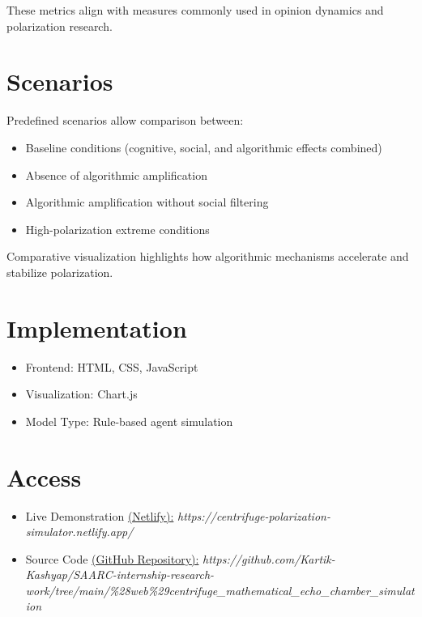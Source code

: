 \documentclass[12pt,a4paper]{report}
\begin{document}
These metrics align with measures commonly used in opinion dynamics and polarization research.

\section{Scenarios}

Predefined scenarios allow comparison between:
\begin{itemize}
    \item Baseline conditions (cognitive, social, and algorithmic effects combined)
    \item Absence of algorithmic amplification
    \item Algorithmic amplification without social filtering
    \item High-polarization extreme conditions
\end{itemize}

Comparative visualization highlights how algorithmic mechanisms accelerate and stabilize polarization.

\section{Implementation}

\begin{itemize}
    \item Frontend: HTML, CSS, JavaScript
    \item Visualization: Chart.js
    \item Model Type: Rule-based agent simulation
\end{itemize}

\section{Access}

\begin{itemize}
    \item Live Demonstration \href{https://centrifuge-polarization-simulator.netlify.app/}{(Netlify):} \textit{https://centrifuge-polarization-simulator.netlify.app/}
    \item Source Code \href{https://github.com/Kartik-Kashyap/SAARC-internship-research-work/tree/main/\%28web\%29centrifuge_mathematical_echo_chamber_simulation}{(GitHub Repository):} \textit{https://github.com/Kartik-Kashyap/SAARC-internship-research-work/tree/main/\%28web\%29centrifuge\_mathematical\_echo\_chamber\_simulation}
\end{itemize}
\end{document}
